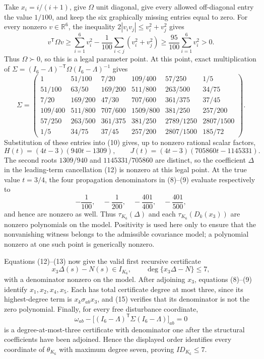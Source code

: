 Take \(x_i=i/(i+1)\), give \(\Omega\) unit diagonal, give every allowed off-diagonal entry the value \(1/100\), and keep the six graphically missing entries equal to zero.  For every nonzero \(v\in\mathbb R^6\), the inequality \(2|v_iv_j|\leq v_i^2+v_j^2\) gives
\[
 v^{\mathsf T}\Omega v
 \geq \sum_{i=1}^6v_i^2-
 \frac1{100}\sum_{i<j}(v_i^2+v_j^2)
 \geq\frac{95}{100}\sum_{i=1}^6v_i^2>0.
\]
Thus \(\Omega\succ0\), so this is a legal parameter point.  At this point, exact multiplication of \(\Sigma=(I_6-\Lambda)^{-\mathsf T}\Omega(I_6-\Lambda)^{-1}\) gives
\[
 \Sigma=\begin{pmatrix}
 1&51/100&7/20&109/400&57/250&1/5\\
 51/100&63/50&169/200&511/800&263/500&34/75\\
 7/20&169/200&47/30&707/600&361/375&37/45\\
 109/400&511/800&707/600&1509/800&381/250&257/200\\
 57/250&263/500&361/375&381/250&2789/1250&2807/1500\\
 1/5&34/75&37/45&257/200&2807/1500&185/72
 \end{pmatrix}.
\]
Substitution of these entries into (10) gives, up to nonzero rational scalar factors,
\[
 H(t)=(4t-3)(940t-1309),\qquad
 J(t)=(4t-3)(705860t-1145331). \tag{14}
\]
The second roots \(1309/940\) and \(1145331/705860\) are distinct, so the coefficient \(\Delta\) in the leading-term cancellation (12) is nonzero at this legal point.  At the true value \(t=3/4\), the four propagation denominators in (8)--(9) evaluate respectively to
\[
 -\frac1{100},\quad-\frac1{200},\quad-\frac{401}{400},\quad-\frac{401}{500}, \tag{15}
\]
and hence are nonzero as well.  Thus \(\tau_{K_6}(\Delta)\) and each \(\tau_{K_6}(D_k(x_3))\) are nonzero polynomials on the model.  Positivity is used here only to ensure that the nonvanishing witness belongs to the admissible covariance model; a polynomial nonzero at one such point is generically nonzero.

Equations (12)--(13) now give the valid first recursive certificate
\[
 x_3\Delta(s)-N(s)\in I_{K_6},\qquad
 \deg\{x_3\Delta-N\}\leq7, \tag{16}
\]
with a denominator nonzero on the model.  After adjoining \(x_3\), equations (8)--(9) identify \(x_1,x_2,x_4,x_5\).  Each has total certificate degree at most three, since its highest-degree term is \(x_k\sigma_{ab}x_3\), and (15) verifies that its denominator is not the zero polynomial.  Finally, for every free disturbance coordinate,
\[
 \omega_{ab}-\bigl[(I_6-\Lambda)^{\mathsf T}\Sigma(I_6-\Lambda)\bigr]_{ab}=0 \tag{17}
\]
is a degree-at-most-three certificate with denominator one after the structural coefficients have been adjoined.  Hence the displayed order identifies every coordinate of \(\theta_{K_6}\) with maximum degree seven, proving \(ID_{K_6}\leq7\).

